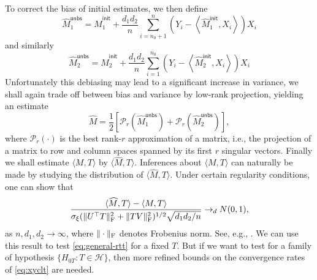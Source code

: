 \documentclass[12pt]{article}
\newcommand{\cH}{\mathcal{H}}
\newcommand{\cP}{\mathcal{P}}
\theoremstyle{plain}
\begin{document}
\begin{sloppypar}
To correct the bias of initial estimates, we then define
$$
\widehat{M}_1^{\mathsf {unbs }}=\widehat{M}_1^{\mathsf{init}}+\frac{d_1 d_2}{n} \sum_{i=n_0+1}^n\left(Y_i-\left\langle\widehat{M}_1^{\mathsf{init}}, X_i\right\rangle\right) X_i 
$$
and similarly
$$
\widehat{M}_2^{\mathsf {unbs }}=\widehat{M}_2^{\mathsf{init}}+\frac{d_1 d_2}{n} \sum_{i=1}^{n_0}\left(Y_i-\left\langle\widehat{M}_2^{\mathsf{init}}, X_i\right\rangle\right) X_i 
$$
Unfortunately this debiasing may lead to a significant increase in variance, we shall again trade off between bias and variance by low-rank projection, yielding an estimate
$$
\widehat{M}=\frac{1}{2}[\cP_r(\widehat{M}_1^{\mathsf {unbs }})+\cP_r(\widehat{M}_2^{\mathsf {unbs }})],
$$
where $\cP_r(\cdot)$ is the best rank-$r$ approximation of a matrix, i.e., the projection of a matrix to row and column spaces spanned by its first $r$ singular vectors. Finally we shall estimate $\langle M, T\rangle$ by $\langle \widehat{M}, T\rangle$. Inferences about $\langle M, T\rangle$ can naturally be made by studying the distribution of $\langle \widehat{M}, T\rangle$. Under certain regularity conditions, one can show that
\begin{equation}\label{eq:xyclt}
\frac{\langle \widehat{M}, T\rangle-\langle M, T\rangle}{\sigma_\xi(\|U^\top T\|_{\rm F}^2+\|TV\|_{\rm F}^2)^{1/2}\sqrt{d_1d_2/n}}\to_dN(0,1),
\end{equation}
as $n, d_1,d_2\to\infty$, where $\|\cdot\|_{\rm F}$ denotes Frobenius norm. See, e.g., \cite{chen2019inference,xia2021statistical,cai2022uncertainty}. We can use this result to test \eqref{eq:general-rtt} for a fixed $T$. But if we want to test for a family of hypothesis $\{H_{0T}: T\in \cH\}$, then more refined bounds on the convergence rates of \eqref{eq:xyclt} are needed.


\end{sloppypar}
\end{document}
